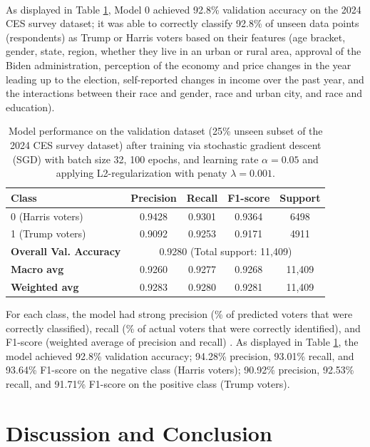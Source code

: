 \documentclass[letter]{article}
\begin{document}
\\
As displayed in Table \ref{tab:ml-results}, Model 0 achieved 92.8\% validation accuracy on the 2024 CES survey dataset; it was able to correctly classify 92.8\% of unseen data points (respondents) as Trump or Harris voters based on their features (age bracket, gender, state, region, whether they live in an urban or rural area, approval of the Biden administration, perception of the economy and price changes in the year leading up to the election, self-reported changes in income over the past year, and the interactions between their race and gender, race and urban city, and race and education). 
\begin{table}[H]
\centering
\begin{tabular}{lcccc}
\toprule
\textbf{Class} & \textbf{Precision} & \textbf{Recall} & \textbf{F1-score} & \textbf{Support} \\
\midrule
0 (Harris voters) & 0.9428 & 0.9301 & 0.9364 & 6498 \\
1 (Trump voters) & 0.9092 & 0.9253 & 0.9171 & 4911 \\
\midrule
\textbf{Overall Val. Accuracy} & \multicolumn{4}{c}{0.9280 (Total support: 11,409)} \\
\textbf{Macro avg} & 0.9260  & 0.9277 & 0.9268 & 11,409 \\
\textbf{Weighted avg} & 0.9283 & 0.9280 & 0.9281 & 11,409 \\
\bottomrule
\end{tabular}
\caption{Model performance on the validation dataset (25\% unseen subset of the 2024 CES survey dataset) after training via stochastic gradient descent (SGD) with batch size 32, 100 epochs, and learning rate $\alpha=0.05$ and applying L2-regularization with penaty $\lambda=0.001$.}
\label{tab:ml-results}
\end{table}
For each class, the model had strong precision (\% of predicted voters that were correctly classified), recall (\% of actual voters that were correctly identified), and F1-score (weighted average of precision and recall) \cite{scikit-learn}. As displayed in Table \ref{tab:ml-results}, the model achieved 92.8\% validation accuracy; 94.28\% precision, 93.01\% recall, and 93.64\% F1-score on the negative class (Harris voters); 90.92\% precision, 92.53\% recall, and 91.71\% F1-score on the positive class (Trump voters). 
\section{Discussion and Conclusion}
\end{document}
